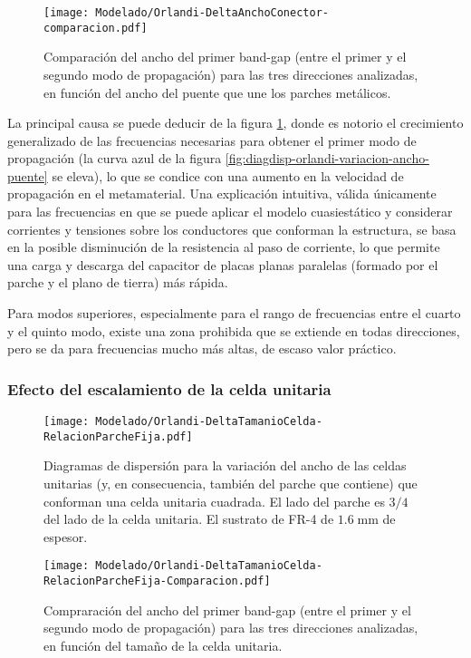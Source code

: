 \begin{figure}[h]
	\centering
	\texttt{[image: Modelado/Orlandi-DeltaAnchoConector-comparacion.pdf]}
	\caption{Comparación del ancho del primer band-gap (entre el primer y el segundo modo de propagación) para las tres direcciones analizadas, en función del ancho del puente que une los parches metálicos.}
	\label{fig:comparacion-diagdisp-orlandi-variacion-ancho-puente}
\end{figure}

La principal causa se puede deducir de la figura \ref{fig:comparacion-diagdisp-orlandi-variacion-ancho-puente}, donde es notorio el crecimiento generalizado de las frecuencias necesarias para obtener el primer modo de propagación (la curva azul de la figura \ref{fig:diagdisp-orlandi-variacion-ancho-puente} se eleva), lo que se condice con una aumento en la velocidad de propagación en el metamaterial. Una explicación intuitiva, válida únicamente para las frecuencias en que se puede aplicar el modelo cuasiestático y considerar corrientes y tensiones sobre los conductores que conforman la estructura, se basa en la posible disminución de la resistencia al paso de corriente, lo que permite una carga y descarga del capacitor de placas planas paralelas (formado por el parche y el plano de tierra) más rápida.

Para modos superiores, especialmente para el rango de frecuencias entre el cuarto y el quinto modo, existe una zona prohibida que se extiende en todas direcciones, pero se da para frecuencias mucho más altas, de escaso valor práctico.

\clearpage
\subsubsection{Efecto del escalamiento de la celda unitaria}

\begin{figure}[h]
	\centering
	\texttt{[image: Modelado/Orlandi-DeltaTamanioCelda-RelacionParcheFija.pdf]}
	\caption{Diagramas de dispersión para la variación del ancho de las celdas unitarias (y, en consecuencia, también del parche que contiene) que conforman una celda unitaria cuadrada. El lado del parche es $3/4$ del lado de la celda unitaria. El sustrato de FR-4 de $1.6\;\text{mm}$ de espesor.}
	\label{fig:diagdisp-orlandi-variacion-tam-celda-unitaria}
\end{figure}

\begin{figure}[h]
	\centering
	\texttt{[image: Modelado/Orlandi-DeltaTamanioCelda-RelacionParcheFija-Comparacion.pdf]}
	\caption{Compraración del ancho del primer band-gap (entre el primer y el segundo modo de propagación) para las tres direcciones analizadas, en función del tamaño de la celda unitaria.}
	\label{fig:comparacion-diagdisp-orlandi-variacion-tam-celda-unitaria}
\end{figure}

